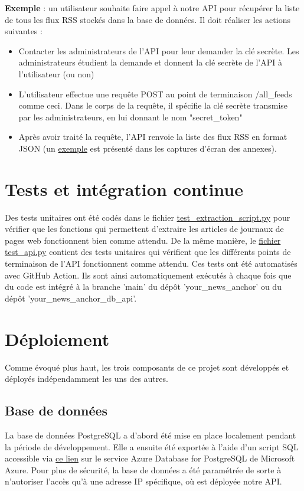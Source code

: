 \documentclass[french]{article}
\begin{document}
    \textbf{Exemple} : un utilisateur souhaite faire appel à notre API pour récupérer la liste de tous les flux RSS stockés dans la base de données. Il doit réaliser les actions suivantes :
    \begin{itemize}
        \item Contacter les administrateurs de l'API pour leur demander la clé secrète. Les administrateurs étudient la demande et donnent la clé secrète de l'API à l'utilisateur (ou non)
        \item L'utilisateur effectue une requête POST au point de terminaison /all\_feeds comme ceci. Dans le corps de la requête, il spécifie la clé secrète transmise par les administrateurs, en lui donnant le nom "secret\_token"
        \item Après avoir traité la requête, l'API renvoie la liste des flux RSS en format JSON (un \hyperref[img:screenshot_api_result]{exemple} est présenté dans les captures d'écran des annexes).
    \end{itemize}

    \section{Tests et intégration continue}

        Des tests unitaires ont été codés dans le fichier \href{https://github.com/vinpap/your_news_anchor/blob/main/test/test_extraction_script.py}{test\_extraction\_script.py} pour vérifier que les fonctions qui permettent d'extraire les articles de journaux de pages web fonctionnent bien comme attendu. De la même manière, le \href{https://github.com/vinpap/your_news_anchor_db_api/blob/main/test_api.py}{fichier test\_api.py} contient des tests unitaires qui vérifient que les différents points de terminaison de l'API fonctionnent comme attendu. Ces tests ont été automatisés avec GitHub Action. Ils sont ainsi automatiquement exécutés à chaque fois que du code est intégré à la branche 'main' du dépôt 'your\_news\_anchor' ou du dépôt 'your\_news\_anchor\_db\_api'.

    \section{Déploiement}
    Comme évoqué plus haut, les trois composants de ce projet sont développés et déployés indépendamment les uns des autres.
    \subsection{Base de données}
    La base de données PostgreSQL a d'abord été mise en place localement pendant la période de développement. Elle a ensuite été exportée à l'aide d'un script SQL accessible via \href{https://github.com/vinpap/your_news_anchor_db_api/blob/main/create_db.sql}{ce lien} sur le service Azure Database for PostgreSQL de Microsoft Azure. 
    Pour plus de sécurité, la base de données a été paramétrée de sorte à n'autoriser l'accès qu'à une adresse IP spécifique, où est déployée notre API.
\end{document}
